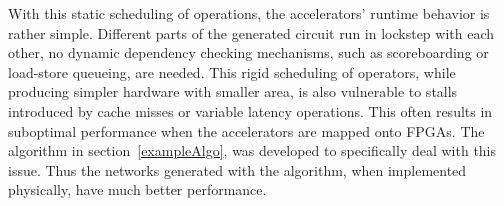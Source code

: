 \documentclass{sig-alternate}
\begin{document}
With this static scheduling of operations, the accelerators' runtime behavior is rather simple. Different parts
of the generated circuit run in lockstep with each other, no dynamic dependency checking mechanisms,
such as scoreboarding or load-store queueing, are needed.
This rigid scheduling of operators, while producing simpler hardware with smaller area,
is also vulnerable to stalls introduced by cache misses or variable latency operations. This often results in suboptimal performance when the accelerators
are mapped onto FPGAs. The algorithm in section~\ref{exampleAlgo}, was developed to
specifically deal with this issue. Thus the networks generated with the algorithm, when implemented physically, have much better performance. 

\end{document}
